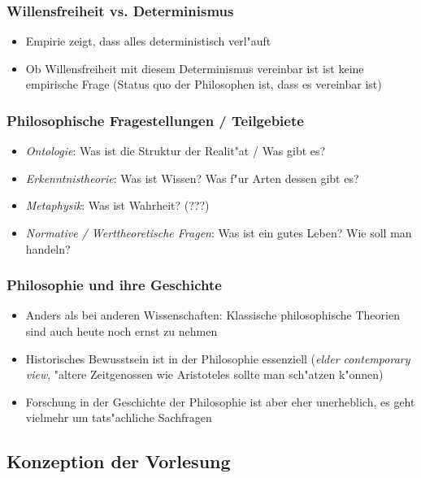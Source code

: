 \documentclass[emulatestandardclasses]{scrartcl}
\begin{document}
\subsubsection{Willensfreiheit vs. Determinismus}

\begin{itemize}
  \item Empirie zeigt, dass alles deterministisch verl"auft
  \item Ob Willensfreiheit mit diesem Determinismus vereinbar ist ist keine empirische Frage (Status quo der Philosophen ist, dass es vereinbar ist)
\end{itemize}

\subsubsection{Philosophische Fragestellungen / Teilgebiete}

\begin{itemize}
  \item \emph{Ontologie}: Was ist die Struktur der Realit"at / Was gibt es?
  \item \emph{Erkenntnistheorie}: Was ist Wissen? Was f"ur Arten dessen gibt es?
  \item \emph{Metaphysik}: Was ist Wahrheit? (???)
  \item \emph{Normative / Werttheoretische Fragen}: Was ist ein gutes Leben? Wie soll man handeln?
\end{itemize}

\subsubsection{Philosophie und ihre Geschichte}

\begin{itemize}
  \item Anders als bei anderen Wissenschaften: Klassische philosophische Theorien sind auch heute noch ernst zu nehmen
  \item Historisches Bewusstsein ist in der Philosophie essenziell (\emph{elder contemporary view}, "altere Zeitgenossen wie Aristoteles sollte man sch"atzen k"onnen)
  \item Forschung in der Geschichte der Philosophie ist aber eher unerheblich, es geht vielmehr um tats"achliche Sachfragen
\end{itemize}

\subsection{Konzeption der Vorlesung}
\end{document}
